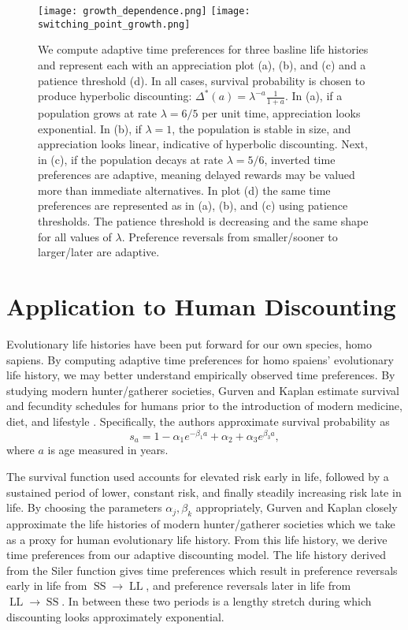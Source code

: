\documentclass[titlepage, hidelinks, 12pt]{article}
\theoremstyle{plain}
\theoremstyle{remark}
\theoremstyle{definition}
\DeclareMathOperator{\smallersooner}{SS}
\DeclareMathOperator{\largerlater}{LL}
\begin{document}
\begin{figure}[H]
    \centering
    \texttt{[image: growth\_dependence.png]}
    \texttt{[image: switching\_point\_growth.png]}
    \caption[Appreciation and preference plots for different demographic trends.]{We compute adaptive time preferences for three basline life histories
    and represent each with an appreciation plot (a), (b), and (c) and a patience threshold (d). In all cases, survival probability is chosen to 
        produce hyperbolic discounting: $\Delta^*(a) = \lambda^{-a}\frac{1}{1+a}$. 
        In (a), if a population grows at rate $\lambda = 6/5$ per unit time, appreciation looks exponential.
        In (b), if $\lambda = 1$, the population is stable in size, and appreciation looks linear, indicative of hyperbolic discounting. Next, in
        (c),
        if the population decays at rate $\lambda = 5/6$, inverted time preferences are adaptive, meaning delayed rewards may be valued more than
        immediate alternatives. In plot (d) the same time preferences are represented as in (a), (b), and (c) using patience thresholds.
        The patience threshold is decreasing and the same shape for all values of $\lambda$. Preference reversals
    from smaller/sooner to larger/later are adaptive.}
\end{figure}
\newpage


\section{Application to Human Discounting}
Evolutionary life histories have been put forward for our own species, homo sapiens. By computing adaptive time preferences for homo spaiens' 
evolutionary life history, we may better understand empirically observed time preferences. By studying modern hunter/gatherer societies, Gurven and Kaplan 
estimate survival and fecundity schedules for humans prior to the introduction of modern medicine, diet, and lifestyle \cite{gurven07}. Specifically,
the authors approximate survival probability as 
\begin{equation}
    s_a = 1 - \alpha_1 e^{-\beta_1 a} + \alpha_2 + \alpha_3 e^{\beta_3 a}, 
    \label{eqn:siler}
\end{equation}
where $a$ is age measured in years. 

The survival function used accounts for elevated risk early in life, followed by a sustained
period of lower, constant risk, and finally steadily increasing risk late in life. By choosing the parameters $\alpha_j, \beta_k$ appropriately,
Gurven and Kaplan closely approximate the life histories of modern hunter/gatherer societies which we take as a proxy for human
evolutionary life history. From this life history, we derive time preferences from our adaptive discounting model. The life history 
derived from the Siler function gives time preferences which 
result in preference reversals early in life from $\smallersooner\to\largerlater$, and preference reversals later in life 
from $\largerlater\to\smallersooner$.
In between these two periods is a lengthy stretch during which discounting looks approximately exponential. 
\end{document}
